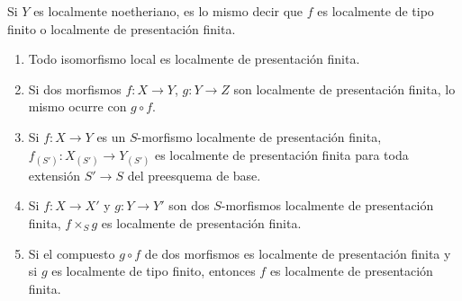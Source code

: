 Si $Y$ es localmente noetheriano, es lo mismo decir que $f$ es
localmente de tipo finito o localmente de presentación finita.

\begin{proposition}[1.4.3]
\label{IV.1.4.3-fr}
\begin{enumerate}
  \item[\textup{(i)}] Todo isomorfismo local es localmente de presentación finita.
  \item[\textup{(ii)}] Si dos morfismos $f:X\to Y$, $g:Y\to Z$ son localmente de
  presentación finita, lo mismo ocurre con $g\circ f$.


  \item[\textup{(iii)}] Si $f:X\to Y$ es un $S$-morfismo localmente de presentación
  finita, $f_{(S')}:X_{(S')}\to Y_{(S')}$ es localmente de presentación finita
  para toda extensión $S'\to S$ del preesquema de base.
  \item[\textup{(iv)}] Si $f:X\to X'$ y $g:Y\to Y'$ son dos $S$-morfismos
  localmente de presentación finita, $f\times_Sg$ es localmente de
  presentación finita.
  \item[\textup{(v)}] Si el compuesto $g\circ f$ de dos morfismos es localmente de
  presentación finita y si $g$ es localmente de tipo finito, entonces $f$ es
  localmente de presentación finita.
\end{enumerate}
\end{proposition}

